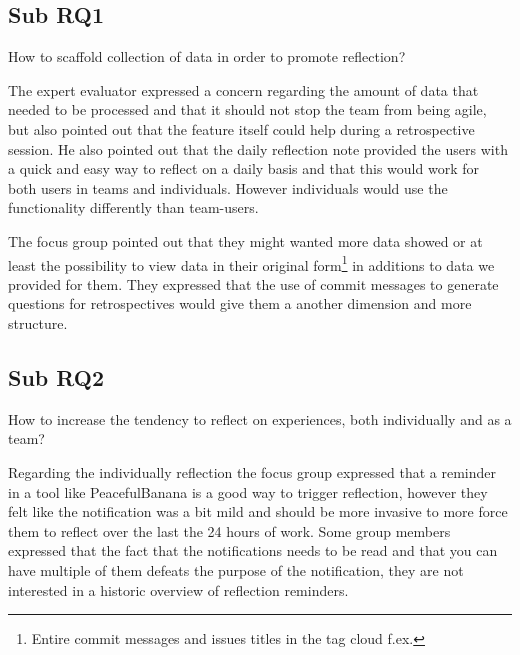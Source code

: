 \subsection{Sub RQ1}
\noindent\makebox[\linewidth]{\rule{\textwidth}{0.5pt}} 

\begin{center}
    How to scaffold collection of data in order to promote reflection? 
\end{center}

\noindent\makebox[\linewidth]{\rule{\textwidth}{0.5pt}} 
The expert evaluator expressed a concern regarding the amount of data that needed to be processed and that it should not stop the team from being agile, but also pointed out that the feature itself could help during a retrospective session. He also pointed out that the daily reflection note provided the users with a quick and easy way to reflect on a daily basis and that this would work for both users in teams and individuals. However individuals would use the functionality differently than team-users.

The focus group pointed out that they might wanted more data showed or at least the possibility to view data in their original form\footnote{Entire commit messages and issues titles in the tag cloud f.ex.} in additions to data we provided for them. They expressed that the use of commit messages to generate questions for retrospectives would give them a another dimension and more structure.

\subsection{Sub RQ2}
\noindent\makebox[\linewidth]{\rule{\textwidth}{0.5pt}} 

\begin{center}
How to increase the tendency to reflect on experiences, both individually and as a team? \\
\end{center}  

\noindent\makebox[\linewidth]{\rule{\textwidth}{0.5pt}}
Regarding the individually reflection the focus group expressed that a reminder in a tool like PeacefulBanana is a good way to trigger reflection, however they felt like the notification was a bit mild and should be more invasive to more force them to reflect over the last the 24 hours of work. Some group members expressed that the fact that the notifications needs to be read and that you can have multiple of them defeats the purpose of the notification, they are not interested in a historic overview of reflection reminders. 

